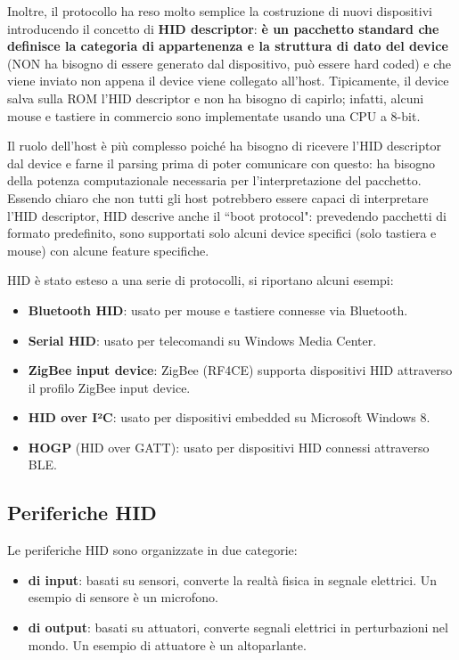 Inoltre, il protocollo ha reso molto semplice la costruzione di nuovi dispositivi introducendo il concetto di \textbf{HID descriptor}:
\textbf{è un pacchetto standard che definisce la categoria di appartenenza e la struttura di dato del device} (NON ha bisogno di essere generato
dal dispositivo, può essere hard coded) e che viene inviato non appena il device viene collegato all'host.
Tipicamente, il device salva sulla ROM l'HID descriptor e non ha bisogno di capirlo; infatti, alcuni mouse e tastiere in commercio sono implementate
usando una CPU a 8-bit.

Il ruolo dell'host è più complesso poich\'e ha bisogno di ricevere l'HID descriptor dal device e farne il parsing prima di poter comunicare con questo:
ha bisogno della potenza computazionale necessaria per l'interpretazione del pacchetto.
Essendo chiaro che non tutti gli host potrebbero essere capaci di interpretare l'HID descriptor, HID descrive anche il ``boot protocol": prevedendo
pacchetti di formato predefinito, sono supportati solo alcuni device specifici (solo tastiera e mouse) con alcune feature specifiche.

HID è stato esteso a una serie di protocolli, si riportano alcuni esempi:
\begin{itemize}
	\itemsep-0.3em 
	\item \textbf{Bluetooth HID}: usato per mouse e tastiere connesse via Bluetooth.
	\item \textbf{Serial HID}: usato per telecomandi su Windows Media Center.
	\item \textbf{ZigBee input device}: ZigBee (RF4CE) supporta dispositivi HID attraverso il profilo ZigBee input device.
	\item \textbf{HID over I²C}: usato per dispositivi embedded su Microsoft Windows 8.
	\item \textbf{HOGP} (HID over GATT): usato per dispositivi HID connessi attraverso BLE.
\end{itemize}

\pagebreak
\subsection*{Periferiche HID}

Le periferiche HID sono organizzate in due categorie:
\begin{itemize}
	\itemsep-0.3em
	\item \textbf{di input}: basati su sensori, converte la realtà fisica in segnale elettrici. Un esempio di sensore è un microfono.
	\item \textbf{di output}: basati su attuatori, converte segnali elettrici in perturbazioni nel mondo. Un esempio di attuatore è un altoparlante.
\end{itemize}

